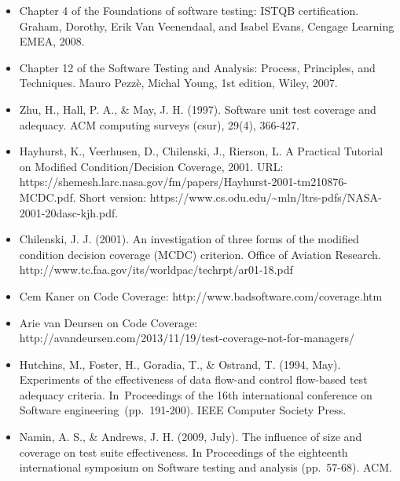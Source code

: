 \begin{itemize}
\item
  Chapter 4 of the Foundations of software testing: ISTQB certification.
  Graham, Dorothy, Erik Van Veenendaal, and Isabel Evans, Cengage
  Learning EMEA, 2008.
\item
  Chapter 12 of the Software Testing and Analysis: Process, Principles,
  and Techniques. Mauro Pezzè, Michal Young, 1st edition, Wiley, 2007.
\item
  Zhu, H., Hall, P. A., \& May, J. H. (1997). Software unit test
  coverage and adequacy. ACM computing surveys (csur), 29(4), 366-427.
\item
  Hayhurst, K., Veerhusen, D., Chilenski, J., Rierson, L. A Practical
  Tutorial on Modified Condition/Decision Coverage, 2001. URL:
  https://shemesh.larc.nasa.gov/fm/papers/Hayhurst-2001-tm210876-MCDC.pdf.
  Short version:
  https://www.cs.odu.edu/\textasciitilde mln/ltrs-pdfs/NASA-2001-20dasc-kjh.pdf.
\item
  Chilenski, J. J. (2001). An investigation of three forms of the
  modified condition decision coverage (MCDC) criterion. Office of
  Aviation Research.
  http://www.tc.faa.gov/its/worldpac/techrpt/ar01-18.pdf
\item
  Cem Kaner on Code Coverage: http://www.badsoftware.com/coverage.htm
\item
  Arie van Deursen on Code Coverage:
  http://avandeursen.com/2013/11/19/test-coverage-not-for-managers/
\item
  Hutchins, M., Foster, H., Goradia, T., \& Ostrand, T. (1994, May).
  Experiments of the effectiveness of data flow-and control flow-based
  test adequacy criteria. In~Proceedings of the 16th international
  conference on Software engineering~(pp.~191-200). IEEE Computer
  Society Press.
\item
  Namin, A. S., \& Andrews, J. H. (2009, July). The influence of size
  and coverage on test suite effectiveness. In Proceedings of the
  eighteenth international symposium on Software testing and analysis
  (pp.~57-68). ACM.
\end{itemize}
